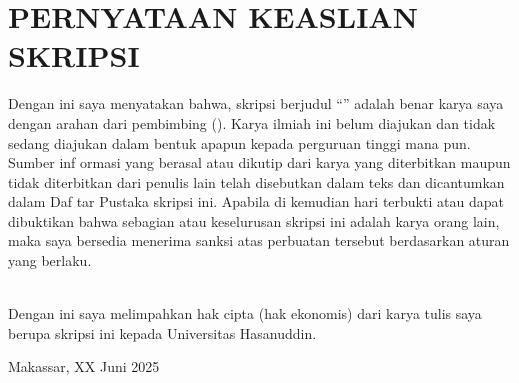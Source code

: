 \begingroup
\singlespacing
\chapter*{PERNYATAAN KEASLIAN SKRIPSI}
\noindent
Dengan ini saya menyatakan bahwa, skripsi berjudul “\textbf{\JudulSkripsi}”
adalah benar karya saya dengan arahan dari pembimbing (\NamaPembimbing). Karya ilmiah ini belum diajukan dan tidak sedang
diajukan dalam bentuk apapun kepada perguruan tinggi mana pun. Sumber
inf ormasi yang berasal atau dikutip dari karya yang diterbitkan
maupun tidak diterbitkan dari penulis lain telah disebutkan dalam
teks dan dicantumkan dalam Daf tar Pustaka skripsi ini. Apabila di
kemudian hari terbukti atau dapat dibuktikan bahwa sebagian atau
keselurusan skripsi ini adalah karya orang lain, maka saya bersedia
menerima sanksi atas perbuatan tersebut berdasarkan aturan yang berlaku. \par

\noindent
\\
Dengan ini saya melimpahkan hak cipta (hak ekonomis) dari karya tulis
saya berupa skripsi ini kepada Universitas Hasanuddin. \par

\vspace{2cm}

\hfill
\begin{minipage}{0.4\textwidth}
  \raggedleft
  Makassar, XX Juni 2025 \par
  \vspace{2cm}
  \NamaPenulis \\
  \NIM
\end{minipage}
\endgroup
